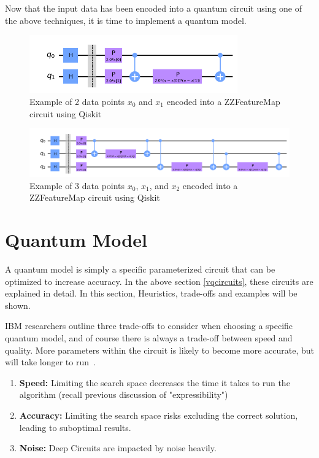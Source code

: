 \documentclass[11pt]{article}
\begin{document}
Now that the input data has been encoded into a quantum circuit using one of the above techniques, it is time to implement a quantum model.

\begin{figure}[!h]
    \centering
    \includegraphics[width=0.8\textwidth]{./figures/two_qubit_feature_map.png} 
    \caption{Example of 2 data points $x_0$ and $x_1$ encoded into a ZZFeatureMap circuit using Qiskit}
    \label{fig:ZZFeatureMap2}
\end{figure}

\begin{figure}[!h]
    \centering
    \includegraphics[width=1\textwidth]{./figures/three_qubit_feature_map.png} 
    \caption{Example of 3 data points $x_0$, $x_1$, and $x_2$ encoded into a ZZFeatureMap circuit using Qiskit}
    \label{fig:ZZFeatureMap3}
\end{figure}



\section{Quantum Model}\label{Quantum Model}

A quantum model is simply a specific parameterized circuit that can be optimized to increase accuracy. In the above section \ref{vqcircuits}, these circuits are explained in 
detail. In this section, Heuristics, trade-offs and examples will be shown. 

IBM researchers outline three trade-offs to consider when choosing a specific quantum model, and of course there is always a trade-off between speed and quality. More parameters
within the circuit is likely to become more accurate, but will take longer to run~\cite{ibmansatz}.

\begin{enumerate}
    \item \textbf{Speed:} Limiting the search space decreases the time it takes to run the algorithm (recall previous discussion of "expressibility") 
    \item \textbf{Accuracy:} Limiting the search space risks excluding the correct solution, leading to suboptimal results.
    \item \textbf{Noise:} Deep Circuits are impacted by noise heavily.
\end{enumerate}
\end{document}
